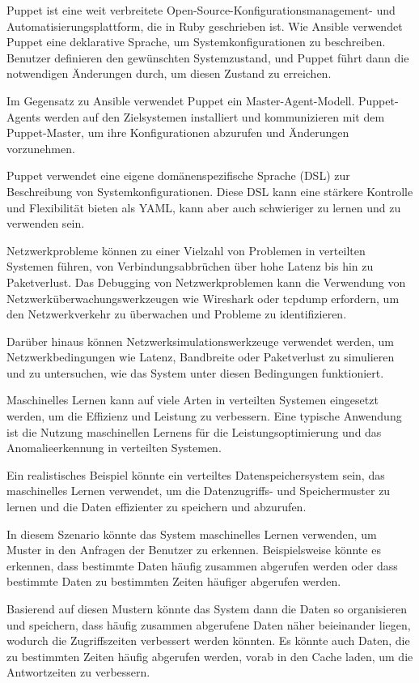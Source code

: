 Puppet ist eine weit verbreitete Open-Source-Konfigurationsmanagement- und Automatisierungsplattform, die in Ruby geschrieben ist. Wie Ansible verwendet Puppet eine deklarative Sprache, um Systemkonfigurationen zu beschreiben. Benutzer definieren den gewünschten Systemzustand, und Puppet führt dann die notwendigen Änderungen durch, um diesen Zustand zu erreichen.

Im Gegensatz zu Ansible verwendet Puppet ein Master-Agent-Modell. Puppet-Agents werden auf den Zielsystemen installiert und kommunizieren mit dem Puppet-Master, um ihre Konfigurationen abzurufen und Änderungen vorzunehmen.

Puppet verwendet eine eigene domänenspezifische Sprache (DSL) zur Beschreibung von Systemkonfigurationen. Diese DSL kann eine stärkere Kontrolle und Flexibilität bieten als YAML, kann aber auch schwieriger zu lernen und zu verwenden sein.


Netzwerkprobleme können zu einer Vielzahl von Problemen in verteilten Systemen führen, von Verbindungsabbrüchen über hohe Latenz bis hin zu Paketverlust. Das Debugging von Netzwerkproblemen kann die Verwendung von Netzwerküberwachungswerkzeugen wie Wireshark oder tcpdump erfordern, um den Netzwerkverkehr zu überwachen und Probleme zu identifizieren.

Darüber hinaus können Netzwerksimulationswerkzeuge verwendet werden, um Netzwerkbedingungen wie Latenz, Bandbreite oder Paketverlust zu simulieren und zu untersuchen, wie das System unter diesen Bedingungen funktioniert.

Maschinelles Lernen kann auf viele Arten in verteilten Systemen eingesetzt werden, um die Effizienz und Leistung zu verbessern. Eine typische Anwendung ist die Nutzung maschinellen Lernens für die Leistungsoptimierung und das Anomalieerkennung in verteilten Systemen.

Ein realistisches Beispiel könnte ein verteiltes Datenspeichersystem sein, das maschinelles Lernen verwendet, um die Datenzugriffs- und Speichermuster zu lernen und die Daten effizienter zu speichern und abzurufen.

In diesem Szenario könnte das System maschinelles Lernen verwenden, um Muster in den Anfragen der Benutzer zu erkennen. Beispielsweise könnte es erkennen, dass bestimmte Daten häufig zusammen abgerufen werden oder dass bestimmte Daten zu bestimmten Zeiten häufiger abgerufen werden.

Basierend auf diesen Mustern könnte das System dann die Daten so organisieren und speichern, dass häufig zusammen abgerufene Daten näher beieinander liegen, wodurch die Zugriffszeiten verbessert werden könnten. Es könnte auch Daten, die zu bestimmten Zeiten häufig abgerufen werden, vorab in den Cache laden, um die Antwortzeiten zu verbessern.


